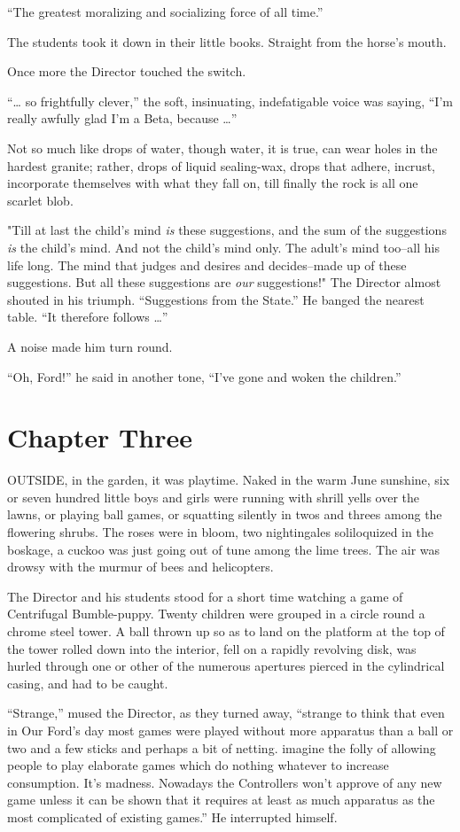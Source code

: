 \documentclass[12pt]{report}
\newcommand{\mychapter}[2]{
\setcounter{chapter}{#1}
    \setcounter{section}{0}
    \chapter*{#2}
    \addcontentsline{toc}{chapter}{#2}
}
\begin{document}
``The greatest moralizing and socializing force of all time.''

The students took it down in their little books. Straight from the
horse's mouth.

Once more the Director touched the switch.

``\ldots{} so frightfully clever,'' the soft, insinuating, indefatigable
voice was saying, ``I'm really awfully glad I'm a Beta, because
\ldots{}''

Not so much like drops of water, though water, it is true, can wear
holes in the hardest granite; rather, drops of liquid sealing-wax, drops
that adhere, incrust, incorporate themselves with what they fall on,
till finally the rock is all one scarlet blob.

"Till at last the child's mind \emph{is} these suggestions, and the sum
of the suggestions \emph{is} the child's mind. And not the child's mind
only. The adult's mind too--all his life long. The mind that judges and
desires and decides--made up of these suggestions. But all these
suggestions are \emph{our} suggestions!" The Director almost shouted in
his triumph. ``Suggestions from the State.'' He banged the nearest
table. ``It therefore follows \ldots{}''

A noise made him turn round.

``Oh, Ford!'' he said in another tone, ``I've gone and woken the
children.''
\mychapter{3}{Chapter Three}
OUTSIDE, in the garden, it was playtime. Naked in the warm June
sunshine, six or seven hundred little boys and girls were running with
shrill yells over the lawns, or playing ball games, or squatting
silently in twos and threes among the flowering shrubs. The roses were
in bloom, two nightingales soliloquized in the boskage, a cuckoo was
just going out of tune among the lime trees. The air was drowsy with the
murmur of bees and helicopters.

The Director and his students stood for a short time watching a game of
Centrifugal Bumble-puppy. Twenty children were grouped in a circle round
a chrome steel tower. A ball thrown up so as to land on the platform at
the top of the tower rolled down into the interior, fell on a rapidly
revolving disk, was hurled through one or other of the numerous
apertures pierced in the cylindrical casing, and had to be caught.

``Strange,'' mused the Director, as they turned away, ``strange to think
that even in Our Ford's day most games were played without more
apparatus than a ball or two and a few sticks and perhaps a bit of
netting. imagine the folly of allowing people to play elaborate games
which do nothing whatever to increase consumption. It's madness.
Nowadays the Controllers won't approve of any new game unless it can be
shown that it requires at least as much apparatus as the most
complicated of existing games.'' He interrupted himself.
\end{document}
